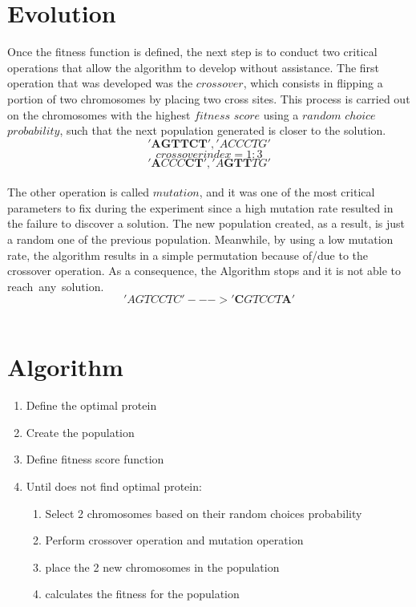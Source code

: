 \documentclass[letterpaper]{article} %
\begin{document}
\section{Evolution}
Once the fitness function is defined, the next step is to conduct two critical operations that allow the algorithm to develop without assistance. The first operation that was developed was the $crossover$, which consists in flipping a portion of two chromosomes by placing two cross sites. This process is carried out on the chromosomes with the highest $fitness$ $score$ using a $random$ $choice$ $probability$, such that the next population generated is closer to the solution.\\
\[{'\textbf{AGTTCT}'}, {'ACCCTG'}\]
\[crossover index = {1:3}\]
\[{'\textbf{A}CCC\textbf{CT}'},{'A\textbf{GTT}TG'}\] \\
The other operation is called $mutation$, and it was one of the most critical parameters to fix during the experiment since a high mutation rate resulted in the failure to discover a solution. The new population created, as a result, is just a random one of the previous population. Meanwhile, by using a low mutation rate, the algorithm results in a simple permutation because of/due to the crossover operation. As a consequence, the Algorithm stops and it is not able to reach any solution.\\ 
\['AGTCCTC' ---> '\textbf{C}GTCCT\textbf{A}' \] \\

\section{Algorithm}
\begin{enumerate}
    \item Define the optimal protein
    \item Create the population
    \item Define fitness score function 
    \item Until does not find optimal protein:
    \begin{enumerate}
        \item Select 2 chromosomes based on their random choices probability 
        \item Perform crossover operation and mutation operation
        \item place the 2 new chromosomes in the population
        \item calculates the fitness for the population 
    \end{enumerate}
\end{enumerate}
\end{document}
